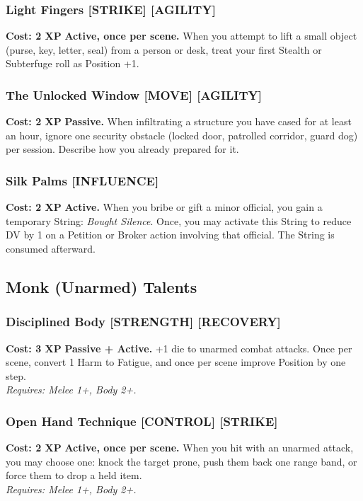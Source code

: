\documentclass[12pt,a4paper]{book}
\begin{document}
\subsubsection*{Light Fingers \textnormal{[STRIKE] [AGILITY]}}
\label{talent:light-fingers}
\textbf{Cost: 2 XP} \textbf{Active, once per scene.} When you attempt to lift a small object (purse, key, letter, seal) from a person or desk, treat your first Stealth or Subterfuge roll as Position +1.

\subsubsection*{The Unlocked Window \textnormal{[MOVE] [AGILITY]}}
\label{talent:unlocked-window}
\textbf{Cost: 2 XP} \textbf{Passive.} When infiltrating a structure you have cased for at least an hour, ignore one security obstacle (locked door, patrolled corridor, guard dog) per session. Describe how you already prepared for it.

\subsubsection*{Silk Palms \textnormal{[INFLUENCE]}}
\label{talent:silk-palms}
\textbf{Cost: 2 XP} \textbf{Active.} When you bribe or gift a minor official, you gain a temporary String: \textit{Bought Silence}. Once, you may activate this String to reduce DV by 1 on a Petition or Broker action involving that official. The String is consumed afterward.

\subsection*{Monk (Unarmed) Talents}
\label{sec:minor-monk}

\subsubsection*{Disciplined Body \textnormal{[STRENGTH] [RECOVERY]}}
\label{talent:disciplined-body}
\textbf{Cost: 3 XP} \textbf{Passive + Active.} +1 die to unarmed combat attacks. Once per scene, convert 1 Harm to Fatigue, and once per scene improve Position by one step. \\
\textit{Requires: Melee 1+, Body 2+.}

\subsubsection*{Open Hand Technique \textnormal{[CONTROL] [STRIKE]}}
\label{talent:open-hand-technique}
\textbf{Cost: 2 XP} \textbf{Active, once per scene.} When you hit with an unarmed attack, you may choose one: knock the target prone, push them back one range band, or force them to drop a held item. \\
\textit{Requires: Melee 1+, Body 2+.}
\end{document}
